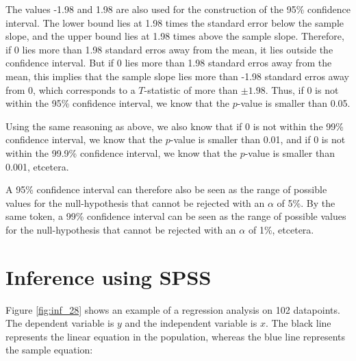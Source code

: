 \documentclass[]{book}\usepackage[]{graphicx}\usepackage[]{color}
\begin{document}
The values -1.98 and 1.98 are also used for the construction of the 95\% confidence interval. The lower bound lies at 1.98 times the standard error below the sample slope, and the upper bound lies at 1.98 times above the sample slope. Therefore, if 0 lies more than 1.98 standard erros away from the mean, it lies outside the confidence interval. But if 0 lies more than 1.98 standard erros away from the mean, this implies that the sample slope lies more than -1.98 standard erros away from 0, which corresponds to a $T$-statistic of more than $\pm 1.98$. Thus, if 0 is not within the 95\% confidence interval, we know that the $p$-value is smaller than 0.05.

Using the same reasoning as above, we also know that if 0 is not within the 99\% confidence interval, we know that the $p$-value is smaller than 0.01, and if 0 is not within the 99.9\% confidence interval, we know that the $p$-value is smaller than 0.001, etcetera.

A 95\% confidence interval can therefore also be seen as the range of possible values for the null-hypothesis that cannot be rejected with an $\alpha$ of 5\%. By the same token, a 99\% confidence interval can be seen as the range of possible values for the null-hypothesis that cannot be rejected with an $\alpha$ of 1\%, etcetera.



\section{Inference using SPSS}

Figure \ref{fig:inf_28} shows an example of a regression analysis on 102 datapoints. The dependent variable is $y$ and the independent variable is $x$. The black line represents the linear equation in the population, whereas the blue line represents the sample equation:
\end{document}
